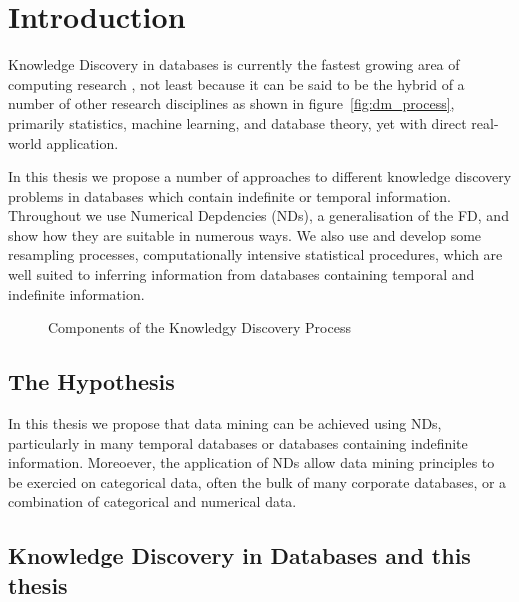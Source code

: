 \chapter{Introduction}\label{chap:intro}

Knowledge Discovery in databases is currently the fastest
growing area of computing research \cite{knowdisc91}, not least because it can be said
to be the hybrid of a number of other research disciplines as shown in
figure~\ref{fig:dm_process}, primarily statistics, machine learning,
and database theory, yet with direct real-world application.

\medskip

In this thesis we propose a number of approaches to different
knowledge discovery
problems in databases which contain indefinite or temporal
information. Throughout we use Numerical Depdencies (NDs), a
generalisation of the FD, and 
show how they are suitable in numerous ways.  We also use and develop some
resampling processes, computationally intensive statistical
procedures, which are well suited to inferring information from
databases containing temporal and indefinite information. 


\begin{figure}
\centerline{}
\caption{\label{fig:kdd_component}Components of the
         Knowledgy Discovery Process}
\end{figure}

\section{The Hypothesis}

In this thesis we propose that data mining can be achieved using NDs,
particularly in many temporal databases or databases containing
indefinite information. Moreoever, the application of NDs allow data
mining principles to be exercied on categorical data, often the bulk
of many corporate databases, or a combination of categorical and
numerical data.

\section{Knowledge Discovery in Databases and this thesis}

